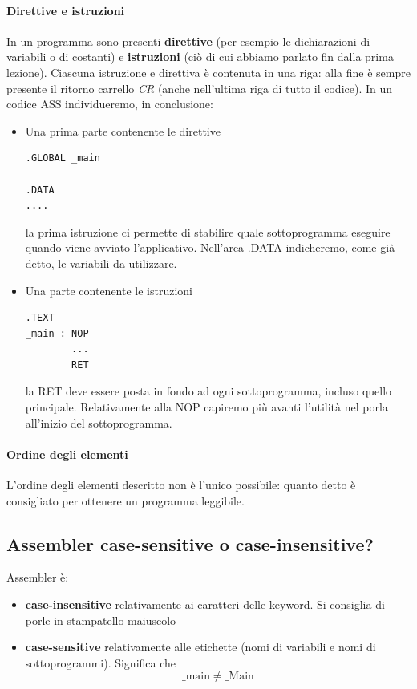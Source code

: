 \documentclass[11pt]{report}
\begin{document}
\paragraph{Direttive e istruzioni} In un programma sono presenti \textbf{direttive} (per esempio le dichiarazioni di variabili o di costanti) e \textbf{istruzioni} (ciò di cui abbiamo parlato fin dalla prima lezione). Ciascuna istruzione e direttiva è contenuta in una riga: alla fine è sempre presente il ritorno carrello \emph{CR} (anche nell'ultima riga di tutto il codice). In un codice ASS individueremo, in conclusione:
\begin{itemize}
\item Una prima parte contenente le direttive
\begin{verbatim}
.GLOBAL _main

.DATA
....
\end{verbatim}
la prima istruzione ci permette di stabilire quale sottoprogramma eseguire quando viene avviato l'applicativo. Nell'area .DATA indicheremo, come già detto, le variabili da utilizzare.
\item Una parte contenente le istruzioni
\begin{verbatim}
.TEXT
_main : NOP
        ...
        RET
\end{verbatim}
la RET deve essere posta in fondo ad ogni sottoprogramma, incluso quello principale. Relativamente alla NOP capiremo più avanti l'utilità nel porla all'inizio del sottoprogramma.
\end{itemize}
\paragraph{Ordine degli elementi} L'ordine degli elementi descritto non è l'unico possibile: quanto detto è consigliato per ottenere un programma leggibile.
\subsection{Assembler case-sensitive o case-insensitive?}
Assembler è:
\begin{itemize}
\item \textbf{case-insensitive} relativamente ai caratteri delle keyword. Si consiglia di porle in stampatello maiuscolo
\item \textbf{case-sensitive} relativamente alle etichette (nomi di variabili e nomi di sottoprogrammi). Significa che
\[\_\text{main} \neq \_\text{Main}\]
\end{itemize}
\end{document}
